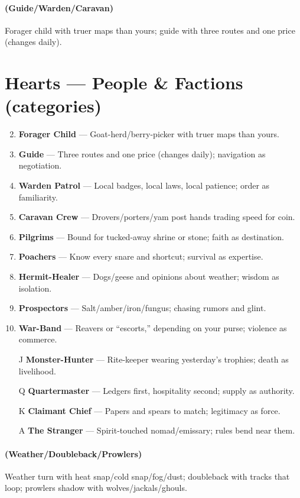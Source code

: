 \paragraph*{(Guide/Warden/Caravan)} Forager child with truer maps than yours; guide with three routes and one price (changes daily).

\section*{Hearts --- People \& Factions (categories)}
\label{sec:wilderness-people}
\begin{enumerate}
\setcounter{enumi}{1}
\item \textbf{Forager Child} --- Goat-herd/berry-picker with truer maps than yours.
\item \textbf{Guide} --- Three routes and one price (changes daily); navigation as negotiation.
\item \textbf{Warden Patrol} --- Local badges, local laws, local patience; order as familiarity.
\item \textbf{Caravan Crew} --- Drovers/porters/yam post hands trading speed for coin.
\item \textbf{Pilgrims} --- Bound for tucked-away shrine or stone; faith as destination.
\item \textbf{Poachers} --- Know every snare and shortcut; survival as expertise.
\item \textbf{Hermit-Healer} --- Dogs/geese and opinions about weather; wisdom as isolation.
\item \textbf{Prospectors} --- Salt/amber/iron/fungus; chasing rumors and glint.
\item \textbf{War-Band} --- Reavers or ``escorts,'' depending on your purse; violence as commerce.
\item[J] \textbf{Monster-Hunter} --- Rite-keeper wearing yesterday's trophies; death as livelihood.
\item[Q] \textbf{Quartermaster} --- Ledgers first, hospitality second; supply as authority.
\item[K] \textbf{Claimant Chief} --- Papers and spears to match; legitimacy as force.
\item[A] \textbf{The Stranger} --- Spirit-touched nomad/emissary; rules bend near them.
\end{enumerate}

\paragraph*{(Weather/Doubleback/Prowlers)} Weather turn with heat snap/cold snap/fog/dust; doubleback with tracks that loop; prowlers shadow with wolves/jackals/ghouls.

